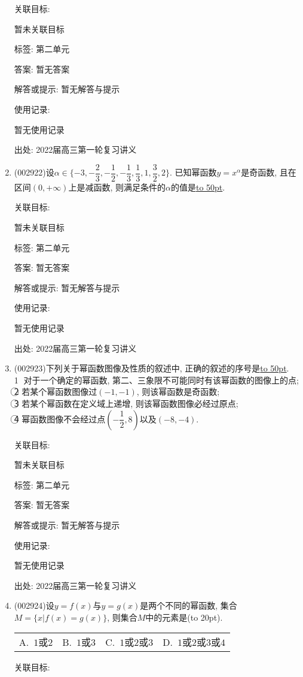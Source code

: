 \documentclass[10pt,a4paper]{article}
\newcommand{\blank}[1]{\underline{\hbox to #1pt{}}}
\newcommand{\bracket}[1]{(\hbox to #1pt{})}
\newcommand{\fourch}[4]{\par\begin{tabular}{p{.23\textwidth}p{.23\textwidth}p{.23\textwidth}p{.23\textwidth}}
A.~#1 &B.~#2& C.~#3& D.~#4
\end{tabular}}
\begin{document}
\begin{enumerate}[1.]
关联目标:

暂未关联目标



标签: 第二单元

答案: 暂无答案

解答或提示: 暂无解答与提示

使用记录:

暂无使用记录


出处: 2022届高三第一轮复习讲义
\item { (002922)}设$\alpha \in \{-3,-\dfrac 23,-\dfrac 12,-\dfrac 13,\dfrac 13,1,\dfrac 32,2\}$. 已知幂函数$y=x^{\alpha}$是奇函数, 且在区间$(0,+\infty)$上是减函数, 则满足条件的$\alpha$的值是\blank{50}.


关联目标:

暂未关联目标



标签: 第二单元

答案: 暂无答案

解答或提示: 暂无解答与提示

使用记录:

暂无使用记录


出处: 2022届高三第一轮复习讲义
\item { (002923)}下列关于幂函数图像及性质的叙述中, 正确的叙述的序号是\blank{50}.\\
\textcircled{1} 对于一个确定的幂函数, 第二、三象限不可能同时有该幂函数的图像上的点;\\
\textcircled{2} 若某个幂函数图像过$(-1,-1)$, 则该幂函数是奇函数;\\
\textcircled{3} 若某个幂函数在定义域上递增, 则该幂函数图像必经过原点;\\
\textcircled{4} 幂函数图像不会经过点$(-\dfrac 12,8)$以及$(-8,-4)$.


关联目标:

暂未关联目标



标签: 第二单元

答案: 暂无答案

解答或提示: 暂无解答与提示

使用记录:

暂无使用记录


出处: 2022届高三第一轮复习讲义
\item { (002924)}设$y=f(x)$与$y=g(x)$是两个不同的幂函数, 集合$M=\{x|f(x)=g(x)  \}$, 则集合$M$中的元素是\bracket{20}.
\fourch{$1$或$2$}{$1$或$3$}{$1$或$2$或$3$}{$1$或$2$或$3$或$4$}


关联目标:


\end{enumerate}
\end{document}
